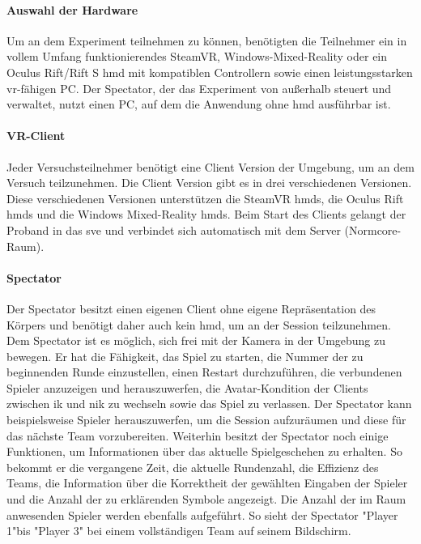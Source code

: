 \documentclass[a4paper,11pt]{article}%
\renewcommand{\\}{\vspace*{0.5\baselineskip} \newline}
\begin{document}
{\paragraph{Auswahl der Hardware}
Um an dem Experiment teilnehmen zu können, benötigten die Teilnehmer ein in vollem Umfang funktionierendes SteamVR, Windows-Mixed-Reality oder ein Oculus Rift/Rift S \ac{hmd} mit kompatiblen Controllern sowie einen leistungsstarken \ac{vr}-fähigen PC. Der Spectator, der das Experiment von außerhalb steuert und verwaltet, nutzt einen PC, auf dem die Anwendung ohne \ac{hmd} ausführbar ist.

\paragraph{VR-Client}
Jeder Versuchsteilnehmer benötigt eine Client Version der Umgebung, um an dem Versuch teilzunehmen. Die Client Version gibt es in drei verschiedenen Versionen. Diese verschiedenen Versionen unterstützen die SteamVR \ac{hmd}s, die Oculus Rift \ac{hmd}s und die Windows Mixed-Reality \ac{hmd}s. Beim Start des Clients gelangt der Proband in das \ac{sve} und verbindet sich automatisch mit dem Server (Normcore-Raum).

\paragraph{Spectator}
Der Spectator besitzt einen eigenen Client ohne eigene Repräsentation des Körpers und benötigt daher auch kein \ac{hmd}, um an der Session teilzunehmen. Dem Spectator ist es möglich, sich frei mit der Kamera in der Umgebung zu bewegen.
Er hat die Fähigkeit, das Spiel zu starten, die Nummer der zu beginnenden Runde einzustellen, einen Restart durchzuführen, die verbundenen Spieler anzuzeigen und herauszuwerfen, die Avatar-Kondition der Clients zwischen \ac{ik} und \ac{nik} zu wechseln sowie das Spiel zu verlassen.
Der Spectator kann beispielsweise Spieler herauszuwerfen, um die Session aufzuräumen und diese für das nächste Team vorzubereiten. Weiterhin besitzt der Spectator noch einige Funktionen, um Informationen über das aktuelle Spielgeschehen zu erhalten. So bekommt er die vergangene Zeit, die aktuelle Rundenzahl, die Effizienz des Teams, die Information über die Korrektheit der gewählten Eingaben der Spieler und die Anzahl der zu erklärenden Symbole angezeigt. Die Anzahl der im Raum anwesenden Spieler werden ebenfalls aufgeführt. So sieht der Spectator "Player 1"bis "Player 3" bei einem vollständigen Team auf seinem Bildschirm. 

}
\end{document}
